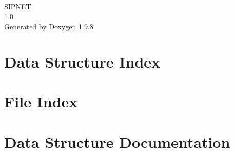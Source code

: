 \documentclass[twoside]{book}
\newcommand{\+}{\discretionary{\mbox{\scriptsize$\hookleftarrow$}}{}{}}
\newcommand{\clearemptydoublepage}{%
    \newpage{\pagestyle{empty}\cleardoublepage}%
  }
\begin{document}
  \raggedbottom
  \begin{titlepage}
  \vspace*{7cm}
  \begin{center}%
  {\Large SIPNET}\\
  [1ex]\large 1.\+0 \\
  \vspace*{1cm}
  {\large Generated by Doxygen 1.9.8}\\
  \end{center}
  \end{titlepage}
  \clearemptydoublepage
  \tableofcontents
  \clearemptydoublepage
\chapter{Data Structure Index}

\chapter{File Index}

\chapter{Data Structure Documentation}
























\end{document}

